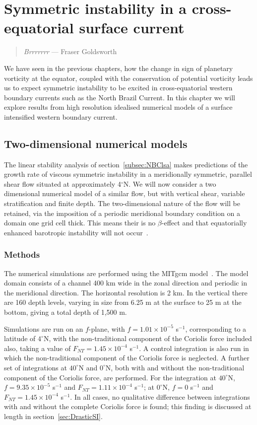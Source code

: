 \chapter{Symmetric instability in a cross-equatorial surface current}
\begin{quote}
    \textit{Brrrrrrr} --- Fraser Goldsworth
\end{quote}

We have seen in the previous chapters, how the change in sign of planetary vorticity at the equator, coupled with the conservation of potential vorticity leads us to expect symmetric instability to be excited in cross-equatorial western boundary currents such as the North Brazil Current. In this chapter we will explore results from high resolution idealised numerical models of a surface intensified western boundary current.

\section{Two-dimensional numerical models}
The linear stability analysis of section~\ref{subsec:NBClsa} makes predictions of the growth rate of viscous symmetric instability in a meridionally symmetric, parallel shear flow situated at approximately 4$^\circ$N. We will now consider a two dimensional numerical model of a similar flow, but with vertical shear, variable stratification and finite depth. The two-dimensional nature of the flow will be retained, via the imposition of a periodic meridional boundary condition on a domain one grid cell thick. This means their is no $\beta$-effect and that equatorially enhanced barotropic instability will not occur~\citep{Edwards1998I,Edwards1998II}.

\subsection{Methods}
\label{subsec:2DMethods}
The numerical simulations are performed using the MITgcm model~\citep{Marshall1997}. The model domain consists of a channel 400 km wide in the zonal direction and periodic in the meridional direction. The horizontal resolution is 2 km. In the vertical there are 160 depth levels, varying in size from 6.25 m at the surface to 25 m at the bottom, giving a total depth of 1,500 m.

Simulations are run on an $f$-plane, with $f = 1.01 \times 10 ^{-5}$ s$^{-1}$, corresponding to a latitude of $4^\circ$N, with the non-traditional component of the Coriolis force included also, taking a value of $F_{NT} = 1.45 \times 10^{-4}$ s$^{-1}$. A control integration is also run in which the non-traditional component of the Coriolis force is neglected. A further set of integrations at $40^\circ$N and $0^\circ$N, both with and without the non-traditional component of the Coriolis force, are performed. For the integration at $40^\circ$N, $f = 9.35 \times 10^{-5} $ s$^{-1}$ and $F_{NT} = 1.11 \times 10^{-4}$ s$^{-1}$; at $0^\circ$N, $f = 0$ s$^{-1}$ and $F_{NT} = 1.45 \times 10^{-4}$ s$^{-1}$. In all cases, no qualitative difference between integrations with and without the complete Coriolis force is found; this finding is discussed at length in section~\ref{sec:DrasticSI}.

